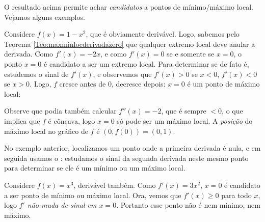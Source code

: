O resultado acima permite achar \emph{candidatos} a pontos de mínimo/máximo
local. Vejamos alguns exemplos.

\begin{ex}
Considere $f(x)=1-x^2$, que é obviamente derivável.
Logo, sabemos pelo Teorema \ref{Teo:maxminlocderivadazero} que qualquer extremo
local deve anular a derivada. Como $f'(x)=-2x$, e como $f'(x)=0$ se e somente se
$x=0$, o ponto $x=0$ é candidato a ser um extremo local. Para determinar se de
fato é, estudemos o sinal de $f'(x)$, e observemos que $f'(x)>0$ 
se $x<0$, $f'(x)<0$ se $x>0$. Logo, $f$ cresce antes de $0$, decresce depois:
$x=0$ é um ponto de máximo local:
\begin{center}
\begin{bmlimage}\end{bmlimage}
\end{center}
Observe que podia também calcular $f''(x)=-2$, que é sempre $<0$, o que implica
que $f$ é côncava, logo $x=0$ só pode ser um máximo local.
A \emph{posição} do máximo local no gráfico de $f$ é $(0,f(0))=(0,1)$.
\end{ex}

\begin{obs}
No exemplo anterior, localizamos um ponto onde a primeira derivada é nula, e
em seguida usamos o : 
estudamos o sinal da segunda derivada neste mesmo ponto para determinar se ele
é um mínimo ou um máximo local.
\end{obs}

\begin{ex}
Considere $f(x)=x^3$, derivável também.
Como $f'(x)=3x^2$, $x=0$ é candidato a ser ponto de mínimo ou máximo local.
Ora, vemos que $f'(x)\geq 0$ para todo $x$, logo \emph{$f'$ não muda de sinal em
$x=0$}. Portanto esse ponto não é nem mínimo, nem máximo.
\end{ex}

